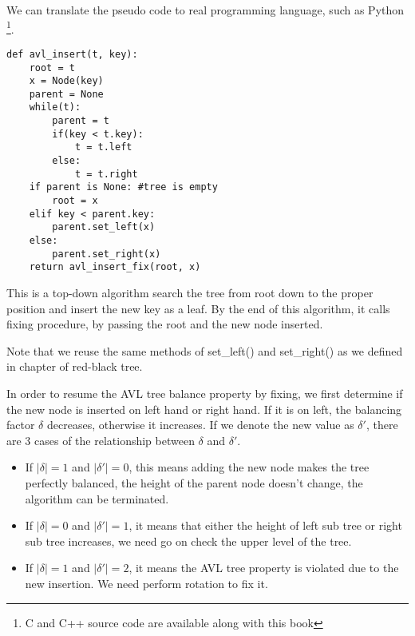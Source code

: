 \documentclass[UTF8]{article}
\begin{document}
We can translate the pseudo code to real programming language, such as
Python \footnote{C and C++ source code are available along with this book}.
\lstset{language=Python}
\begin{lstlisting}
def avl_insert(t, key):
    root = t
    x = Node(key)
    parent = None
    while(t):
        parent = t
        if(key < t.key):
            t = t.left
        else:
            t = t.right
    if parent is None: #tree is empty
        root = x
    elif key < parent.key:
        parent.set_left(x)
    else:
        parent.set_right(x)
    return avl_insert_fix(root, x)
\end{lstlisting}

This is a top-down algorithm search the tree from root down to the proper
position and insert the new key as a leaf. By the end of this algorithm, it calls fixing procedure, by passing the root and the new node inserted.

Note that we reuse the same methods of set\_left() and set\_right() as
we defined in chapter of red-black tree.

In order to resume the AVL tree balance property by fixing, we first determine if the new node is inserted on left hand or right hand. If it is on left, the balancing factor $\delta$ decreases, otherwise it increases. If we denote the new value as $\delta'$, there are 3 cases of the relationship between $\delta$ and $\delta'$.

\begin{itemize}
\item If $|\delta| = 1$ and $|\delta'| = 0$, this means adding the new node makes the tree perfectly balanced, the height of the parent node doesn't change, the algorithm can be terminated.

\item If $|\delta| = 0$ and $|\delta'| = 1$, it means that either the height of left sub tree or right sub tree increases, we need go on check the upper level of the tree.

\item If $|\delta| = 1$ and $|\delta'| = 2$, it means the AVL tree property is violated due to the new insertion. We need perform rotation to fix it.
\end{itemize}
\end{document}
